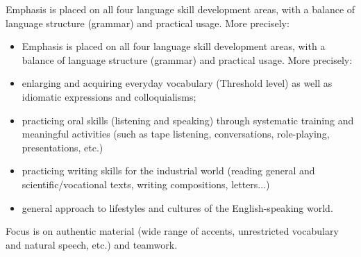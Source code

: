 Emphasis is placed on all four language skill development areas, with a balance of language structure (grammar) and practical usage. More precisely:
\begin{itemize}
    \item Emphasis is placed on all four language skill development areas, with a balance of language structure (grammar) and practical usage. More precisely:
    \item enlarging and acquiring everyday vocabulary (Threshold level) as well as idiomatic expressions and colloquialisms;
    \item practicing oral skills (listening and speaking) through systematic training and meaningful activities (such as tape listening, conversations, role-playing, presentations, etc.)
    \item practicing writing skills for the industrial world (reading general and scientific/vocational texts, writing compositions, letters...)
    \item general approach to lifestyles and cultures of the English-speaking world.
\end{itemize}
Focus is on authentic material (wide range of accents, unrestricted vocabulary and natural speech, etc.) and teamwork.
